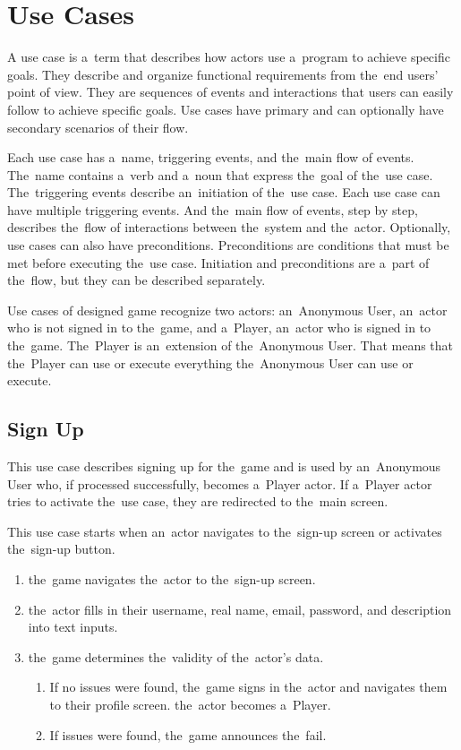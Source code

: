 \section{Use Cases}

A use case is a~term that describes how actors use a~program to achieve specific goals.
They describe and organize functional requirements from the~end users' point of view.
They are sequences of events and interactions that users can easily follow to achieve specific goals.
Use cases have primary and can optionally have secondary scenarios of their flow.

Each use case has a~name, triggering events, and the~main flow of events.
The~name contains a~verb and a~noun that express the~goal of the~use case.
The~triggering events describe an~initiation of the~use case.
Each use case can have multiple triggering events.
And the~main flow of events, step by step, describes the~flow of interactions between the~system and the~actor.
Optionally, use cases can also have preconditions.
Preconditions are conditions that must be met before executing the~use case.
Initiation and preconditions are a~part of the~flow, but they can be described separately.

Use cases of designed game recognize two actors: an~Anonymous User, an~actor who is not signed in to the~game, and a~Player, an~actor who is signed in to the~game.
The~Player is an~extension of the~Anonymous User.
That means that the~Player can use or execute everything the~Anonymous User can use or execute.

\let\oldsubsection=\thesubsection
\renewcommand\thesubsection{UC\arabic{subsection}}

\pagebreak
\subsection{Sign Up}

This use case describes signing up for the~game and is used by an~Anonymous User who, if processed successfully, becomes a~Player actor. If a~Player actor tries to activate the~use case, they are redirected to the~main screen.

This use case starts when an~actor navigates to the~sign-up screen or activates the~sign-up button.

\begin{enumerate}
    \item the~game navigates the~actor to the~sign-up screen.
    \item the~actor fills in their username, real name, email, password, and description into text inputs.
    \item the~game determines the~validity of the~actor's data.
    \begin{enumerate}
        \item If no issues were found, the~game signs in the~actor and navigates them to their profile screen.
        the~actor becomes a~Player.
        \item If issues were found, the~game announces the~fail.
    \end{enumerate}
\end{enumerate}

